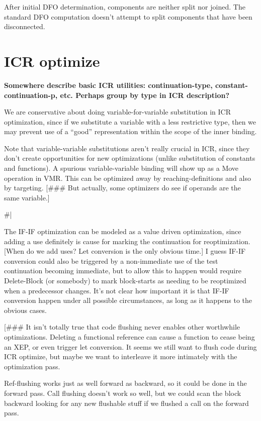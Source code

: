 After initial DFO determination, components are neither split nor joined.  The
standard DFO computation doesn't attempt to split components that have been
disconnected.


\chapter{ICR optimize}

{\bf Somewhere describe basic ICR utilities: continuation-type,
constant-continuation-p, etc.  Perhaps group by type in ICR description?}

We are conservative about doing variable-for-variable substitution in ICR
optimization, since if we substitute a variable with a less restrictive type,
then we may prevent use of a ``good'' representation within the scope of the
inner binding.

Note that variable-variable substitutions aren't really crucial in ICR, since
they don't create opportunities for new optimizations (unlike substitution of
constants and functions).  A spurious variable-variable binding will show up as
a Move operation in VMR.  This can be optimized away by reaching-definitions
and also by targeting.  [\#\#\# But actually, some optimizers do see if operands
are the same variable.]

\#|

The IF-IF optimization can be modeled as a value driven optimization, since
adding a use definitely is cause for marking the continuation for
reoptimization.  [When do we add uses?  Let conversion is the only obvious
time.]  I guess IF-IF conversion could also be triggered by a non-immediate use
of the test continuation becoming immediate, but to allow this to happen would
require Delete-Block (or somebody) to mark block-starts as needing to be
reoptimized when a predecessor changes.  It's not clear how important it is
that IF-IF conversion happen under all possible circumstances, as long as it
happens to the obvious cases.

[\#\#\# It isn't totally true that code flushing never enables other worthwhile
optimizations.  Deleting a functional reference can cause a function to cease
being an XEP, or even trigger let conversion.  It seems we still want to flush
code during ICR optimize, but maybe we want to interleave it more intimately
with the optimization pass.  

Ref-flushing works just as well forward as backward, so it could be done in the
forward pass.  Call flushing doesn't work so well, but we could scan the block
backward looking for any new flushable stuff if we flushed a call on the
forward pass.

